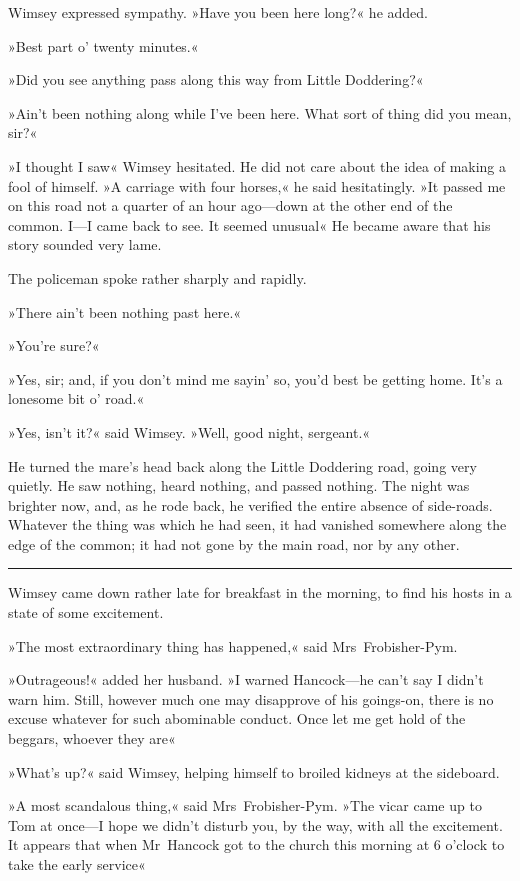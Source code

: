 Wimsey expressed sympathy. »Have you been here long?« he added.

»Best part o' twenty minutes.«

»Did you see anything pass along this way from Little Doddering?«

»Ain't been nothing along while I've been here. What sort of thing did you mean, sir?«

»I thought I saw\longdash« Wimsey hesitated. He did not care about the idea of making a fool of himself. »A carriage with four horses,« he said hesitatingly. »It passed me on this road not a quarter of an hour ago—down at the other end of the common. I—I came back to see. It seemed unusual\longdash« He became aware that his story sounded very lame.

The policeman spoke rather sharply and rapidly.

»There ain't been nothing past here.«

»You're sure?«

»Yes, sir; and, if you don't mind me sayin' so, you'd best be getting home. It's a lonesome bit o' road.«

»Yes, isn't it?« said Wimsey. »Well, good night, sergeant.«

He turned the mare's head back along the Little Doddering road, going very quietly. He saw nothing, heard nothing, and passed nothing. The night was brighter now, and, as he rode back, he verified the entire absence of side-roads. Whatever the thing was which he had seen, it had vanished somewhere along the edge of the common; it had not gone by the main road, nor by any other.

\noindent\hfil\rule{0.5\textwidth}{.4pt}\hfil 

Wimsey came down rather late for breakfast in the morning, to find his hosts in a state of some excitement.

»The most extraordinary thing has happened,« said Mrs~Frobisher-Pym.

»Outrageous!« added her husband. »I warned Hancock—he can't say I didn't warn him. Still, however much one may disapprove of his goings-on, there is no excuse whatever for such abominable conduct. Once let me get hold of the beggars, whoever they are\longdash«

»What's up?« said Wimsey, helping himself to broiled kidneys at the sideboard.

»A most scandalous thing,« said Mrs~Frobisher-Pym. »The vicar came up to Tom at once—I hope we didn't disturb you, by the way, with all the excitement. It appears that when Mr~Hancock got to the church this morning at 6 o'clock to take the early service\longdash«

